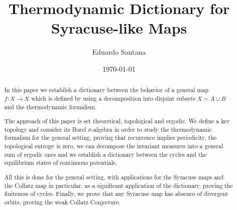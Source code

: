 \documentclass[12 pt]{amsart}
\title[]
{Thermodynamic Dictionary for Syracuse-like Maps}
\author[Eduardo Santana]{Eduardo Santana}
\date{\today}
\theoremstyle{definition}
\begin{document}
	
	\begin{abstract}
	In this paper we  estabilsh a dictionary between the behavior of a general map $f: X \to X$ which is defined by using a decomposition into disjoint subsets $X = A \cup B$ and the thermodynamic formalism.
	
	The approach of this paper is set theoretical, topological and ergodic. We define a key topology and consider its Borel $\sigma$-algebra in order to study the thermodynamic formalism for the general setting, proving that recurrence implies periodicity, the topological entropy is zero, we can decompose the invariant measures into a general sum of ergodic ones and we establish a dictionary between the cycles and the equilibrium states of continuous potentials.
	
	All this is done for the general setting, with applications for the Syracuse maps and the Collatz map in particular, as a significant application of the dictionary, proving the finiteness of cycles. Finally, we prove that any Syracuse map has absence of divergent orbits, proving the weak Collatz Conjecture. 
	\end{abstract}
	
	\maketitle
\end{document}
